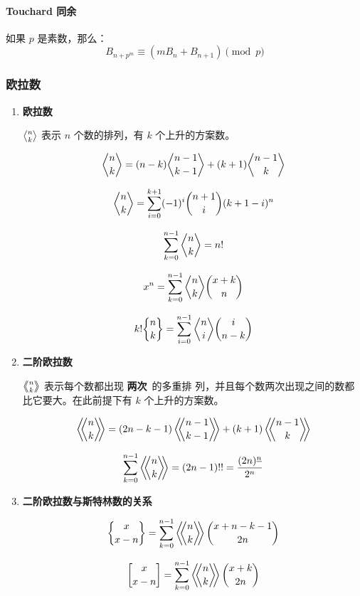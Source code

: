 \documentclass[a4paper, twoside]{article}
\begin{document}
        \paragraph{Touchard 同余} 如果 $p$ 是素数，那么：
        $$ B_{n + p^m} \equiv (m B_n + B_{n + 1}) \pmod p $$


    \subsubsection{欧拉数}
    \label{EulerianNumber}
        \def \bangle{ \atopwithdelims \langle \rangle}

        \begin{enumerate}
        
        \item \textbf{欧拉数}
        
        ${n\bangle k}$ 表示 $n$ 个数的排列，有 $k$ 个上升的方案数。
        
        $$ {n\bangle k} = (n - k){n - 1 \bangle k - 1} + (k + 1){n - 1 \bangle k} $$
        
        $$ {n\bangle k} = \sum_{i = 0} ^ {k + 1} (-1)^i \binom{n+1}{i} (k + 1 - i)^n $$
        
        $$ \sum_{k = 0} ^ {n - 1} {n\bangle k} = n! $$
        
        $$ x^n = \sum_{k = 0} ^ {n - 1} {n\bangle k} \binom{x+k}{n} $$
        
        $$ k!{n\brace k} = \sum_{i = 0} ^ {n - 1} {n\bangle i} \binom{i}{n-k} $$
        
        \item \textbf{二阶欧拉数}
        
        $\left\langle\!\!{n\bangle k}\!\!\right\rangle$ 表示每个数都出现 \textbf{两次}\ 的多重排        列，并且每个数两次出现之间的数都比它要大。在此前提下有 $k$ 个上升的方案数。
        
        $$ \left\langle\!\!{n\bangle k}\!\!\right\rangle = (2n-k-1)\left\langle\!\!{n-1\bangle      k-1}\!\!\right\rangle + (k+1)\left\langle\!\!{n-1 \bangle k}\!\!\right\rangle $$
        
        $$ \sum_{k = 0} ^ {n - 1} \left\langle\!\!{n\bangle k}\!\!\right\rangle = (2n-1)!! =        \frac{(2n)^{\underline n}} {2^n} $$
        
        \item \textbf{二阶欧拉数与斯特林数的关系}
        
        $$ {x \brace x-n} = \sum_{k = 0} ^ {n - 1} \left\langle\!\!{n\bangle k}\!\!\right\rangle        \binom{x + n - k - 1}{2n} $$
        
        $$ {x \brack x-n} = \sum_{k = 0} ^ {n - 1} \left\langle\!\!{n\bangle k}\!\!\right\rangle        \binom{x+k}{2n} $$
        
        \end{enumerate}
\end{document}
